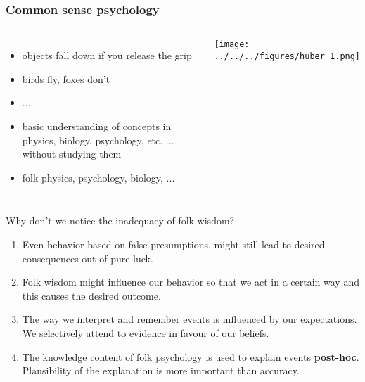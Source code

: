 \documentclass[]{beamer}
\begin{document}
\begin{frame}
 \frametitle{Common sense psychology}
\begin{columns}[c]
 \column[c]{10cm}
  \begin{itemize}
 \setlength{\itemsep}{5pt}
   \item objects fall down if you release the grip
   \item birds fly, foxes don't
   \item[] ...
   \item<2->[$\rightarrow$] basic understanding of concepts in physics, biology, psychology, etc. ... without studying them \item<2-> \alert{folk-}physics, psychology, biology, ...
  \end{itemize}
 \column{2cm}
  \texttt{[image: ../../../figures/huber\_1.png]}
\end{columns}

\vspace{4mm}
\end{frame}

\begin{frame}{Why don't we notice the inadequacy of folk wisdom?}
\begin{overlayarea}{110mm}{70mm}
  \begin{enumerate}[<+->]
\setlength{\itemsep}{10pt}
   \item Even behavior based on false presumptions, might still
lead to desired consequences out of pure luck.
   \item Folk wisdom might influence our behavior so that we act in a
certain way and this causes the desired outcome.
   \item The way we interpret and remember events is influenced by our expectations. We selectively attend to evidence in favour of our beliefs. 
   

   \item The knowledge content of folk psychology is used to explain events
\textbf{post-hoc}. Plausibility of the explanation is more important than accuracy. 
  \end{enumerate}
\end{overlayarea}
\end{frame}
\end{document}
